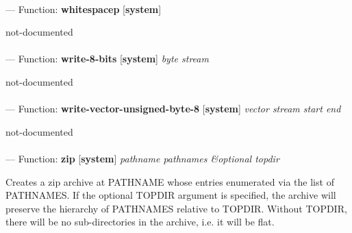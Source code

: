 \paragraph{}
\label{SYSTEM:WHITESPACEP}
--- Function: \textbf{whitespacep} [\textbf{system}] \textit{}

\begin{adjustwidth}{5em}{5em}
not-documented
\end{adjustwidth}

\paragraph{}
\label{SYSTEM:WRITE-8-BITS}
--- Function: \textbf{write-8-bits} [\textbf{system}] \textit{byte stream}

\begin{adjustwidth}{5em}{5em}
not-documented
\end{adjustwidth}

\paragraph{}
\label{SYSTEM:WRITE-VECTOR-UNSIGNED-BYTE-8}
--- Function: \textbf{write-vector-unsigned-byte-8} [\textbf{system}] \textit{vector stream start end}

\begin{adjustwidth}{5em}{5em}
not-documented
\end{adjustwidth}

\paragraph{}
\label{SYSTEM:ZIP}
--- Function: \textbf{zip} [\textbf{system}] \textit{pathname pathnames \&optional topdir}

\begin{adjustwidth}{5em}{5em}
Creates a zip archive at PATHNAME whose entries enumerated via the list of PATHNAMES.
If the optional TOPDIR argument is specified, the archive will preserve the hierarchy of PATHNAMES relative to TOPDIR.  Without TOPDIR, there will be no sub-directories in the archive, i.e. it will be flat.
\end{adjustwidth}

